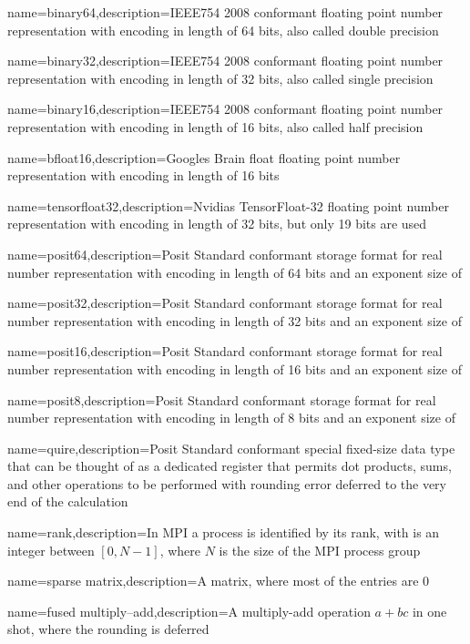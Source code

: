 
    {name=binary64,description={IEEE754 2008 \cite{ieee754_2008} conformant floating point number representation with encoding in length of \num{64} bits, also called double precision}}

    {name=binary32,description={IEEE754 2008 \cite{ieee754_2008} conformant floating point number representation with encoding in length of \num{32} bits, also called single precision}}

    {name=binary16,description={IEEE754 2008 \cite{ieee754_2008} conformant floating point number representation with encoding in length of \num{16} bits, also called half precision}}

    {name=bfloat16,description={Googles Brain float \cite{bfloat16} floating point number representation with encoding in length of \num{16} bits}}

    {name=tensorfloat32,description={Nvidias TensorFloat-32 \cite{tf32} floating point number representation with encoding in length of \num{32} bits, but only \num{19} bits are used}}

    {name=posit64,description={Posit Standard \cite{posit2018standard} conformant storage format for real number representation with encoding in length of \num{64} bits and an exponent size of }}

    {name=posit32,description={Posit Standard \cite{posit2018standard} conformant storage format for real number representation with encoding in length of \num{32} bits and an exponent size of }}

    {name=posit16,description={Posit Standard \cite{posit2018standard} conformant storage format for real number representation with encoding in length of \num{16} bits and an exponent size of }}

    {name=posit8,description={Posit Standard \cite{posit2018standard} conformant storage format for real number representation with encoding in length of \num{8} bits and an exponent size of }}

    {name=quire,description={Posit Standard \cite{posit2018standard} conformant special fixed-size data type that can be thought of as a dedicated register that permits dot products, sums, and other operations to be performed with rounding error deferred to the very end of the calculation \cite{gustafson2017}}}

    {name=rank,description={In \acrshort{MPI} a process is identified by its rank, with is an integer between $[0, N-1]$, where $N$ is the size of the MPI process group}}

    {name=sparse matrix,description={A matrix, where most of the entries are \num{0}}}

    {name=fused multiply–add,description={A multiply-add operation $a + bc$ in one shot, where the rounding is deferred}}
